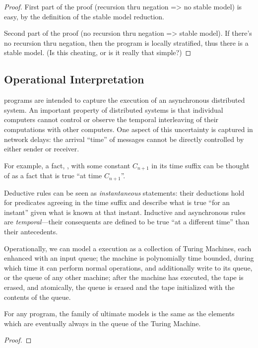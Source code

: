 \begin{proof}

First part of the proof (recursion thru negation => no stable model) is easy, by the definition of the stable model reduction.

Second part of the proof (no recursion thru negation => stable model).  If there's no recursion thru negation, then the program is locally stratified, thus there is a stable model.  (Is this cheating, or is it really that simple?)

\end{proof}

\subsection{Operational Interpretation}
\lang programs are intended to capture the execution of an asynchronous distributed system.  An important property of distributed systems is that individual computers cannot control or observe the temporal interleaving of their computations with other computers.  One aspect of this uncertainty is captured in network delays: the arrival ``time'' of messages cannot be directly controlled by either sender or receiver.

For example, a fact, , with some constant $C_{n+1}$ in its time
suffix can be thought of as a fact that is true ``at time $C_{n+1}$''.

Deductive rules can be seen as {\em instantaneous} statements: their deductions hold for 
predicates agreeing in the time suffix and describe what is true ``for an instant'' given 
what is known at that instant.
 Inductive and asynchronous 
 rules are {\em temporal}---their consequents are defined to
be true ``at a different time'' than their antecedents.

Operationally, we can model a \lang execution as a collection of Turing Machines, each enhanced with an input queue; the machine is polynomially time bounded, during which time it can perform normal operations, and additionally write to its queue, or the queue of any other machine; after the machine has executed, the tape is erased, and atomically, the queue is erased and the tape initialized with the contents of the queue. 

\begin{lemma}
For any \lang program, the family of ultimate models is the same as the elements which are eventually always in the queue of the Turing Machine. 
\end{lemma}
\begin{proof}
\end{proof}


